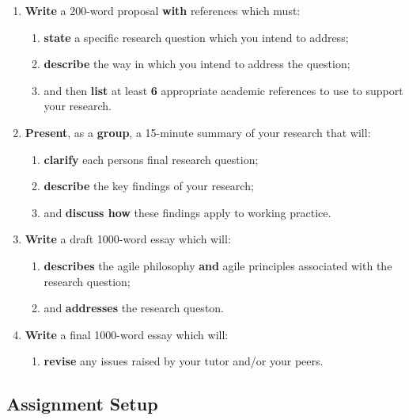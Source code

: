 \documentclass{../fal_assignment}
\begin{document}
\begin{enumerate}[label=(\alph*)]
    \item \textbf{Write} a 200-word proposal \textbf{with} references which must:
    	\begin{enumerate}[label=\roman*.]
    		\item \textbf{state} a specific research question which you intend to address;
    		\item \textbf{describe} the way in which you intend to address the question;
    		\item and then \textbf{list} at least \textbf{6} appropriate academic references to use to support your research.
	\end{enumerate}
    \item \textbf{Present}, as a \textbf{group}, a 15-minute summary of your research that will:
    	\begin{enumerate}[label=\roman*.]
    		\item \textbf{clarify} each persons final research question;
    		\item \textbf{describe} the key findings of your research;
    		\item and \textbf{discuss how} these findings apply to working practice.
	\end{enumerate}
    \item \textbf{Write} a draft 1000-word essay which will:
    	\begin{enumerate}[label=\roman*.]
    		\item \textbf{describes} the agile philosophy \textbf{and} agile principles associated with the research question;
    		\item and \textbf{addresses} the research queston.
	\end{enumerate}
    \item \textbf{Write} a final 1000-word essay which will:
    	\begin{enumerate}[label=\roman*.]
    		\item \textbf{revise} any issues raised by your tutor and/or your peers.
	\end{enumerate}
\end{enumerate}


\subsection*{Assignment Setup}
\end{document}
